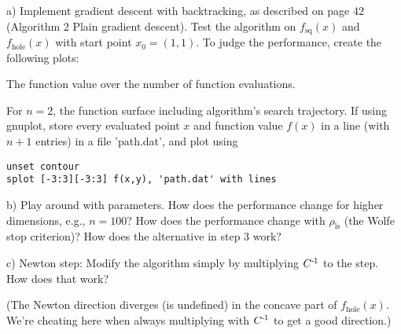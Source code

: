 a) Implement gradient descent with backtracking, as described on page 42 (Algorithm 2 Plain gradient descent). Test the algorithm on
$f_\text{sq}(x)$ and $f_\text{hole}(x)$ with start point
$x_0=(1,1)$. To judge the performance, create the following plots:
\begin{items}
  \item The function value over the number of function evaluations.
  \item For $n=2$, the function surface including algorithm's search trajectory. If using gnuplot, store every evaluated point $x$ and function value $f(x)$ in a line (with $n+1$ entries) in a file 'path.dat', and plot using
\begin{code}
\begin{Verbatim}[numbers=none]
unset contour
splot [-3:3][-3:3] f(x,y), 'path.dat' with lines
\end{Verbatim}
\end{code}
\end{items}

b) Play around with parameters. How does the performance change for higher dimensions, e.g., $n=100$? How does the performance change with
$\rho_\text{ls}$ (the Wolfe stop criterion)?  How does the alternative
in step 3 work?

c) Newton step: Modify the algorithm simply by multiplying $C^{{\hspace*{-.0pt}\text{\rm -}\hspace*{-.5pt}}1}$ to the step. How does that work?

(The Newton direction diverges (is undefined) in the
concave part of $f_\text{hole}(x)$. We're cheating here when always multiplying with $C^{{\hspace*{-.0pt}\text{\rm -}\hspace*{-.5pt}}1}$ to get a good direction.)

\exerfoot





